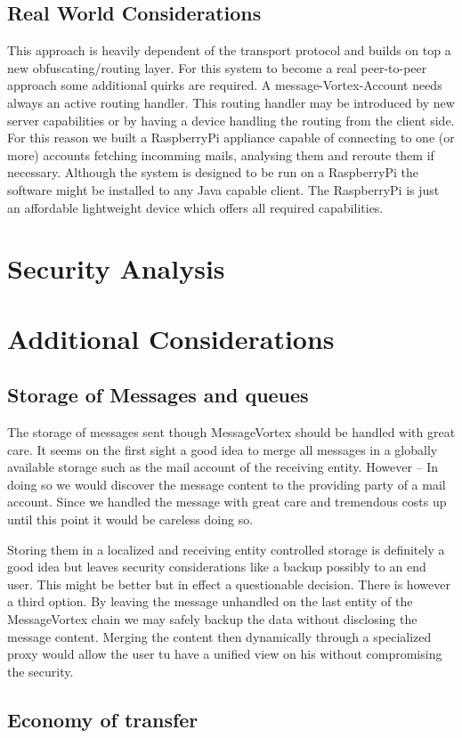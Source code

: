 \section{Real World Considerations}
This approach is heavily dependent of the transport protocol and builds on top a new obfuscating/routing layer. For this system to become a real peer-to-peer approach some additional quirks are required. A message-Vortex-Account needs always an active routing handler. This routing handler may be introduced by new server capabilities or by having a device handling the routing from the client side. For this reason we built a RaspberryPi appliance capable of connecting to one (or more) accounts fetching incomming mails, analysing them and reroute them if necessary. Although the system is designed to be run on a RaspberryPi the software might be installed to any Java capable client. The RaspberryPi is just an affordable lightweight device which offers all required capabilities.

\chapter{Security Analysis}

\chapter{Additional Considerations}

\section{Storage of Messages and queues}
The storage of messages sent though MessageVortex should be handled with great care. It seems on the first sight a good idea to merge all messages in a globally available storage such as the mail account of the receiving entity. However -- In doing so we would discover the message content to the providing party of a mail account. Since we handled the message with great care and tremendous costs up until this point it would be careless doing so. 

Storing them in a localized and receiving entity controlled storage is definitely a good idea but leaves security considerations like a backup possibly to an end user. This might be better but in effect a questionable decision. There is however a third option. By leaving the message unhandled on the last entity of the MessageVortex chain we may safely backup the data without disclosing the message content. Merging the content then dynamically through a specialized proxy would allow the user tu have a unified view on his without compromising the security.


\section{Economy of transfer}
